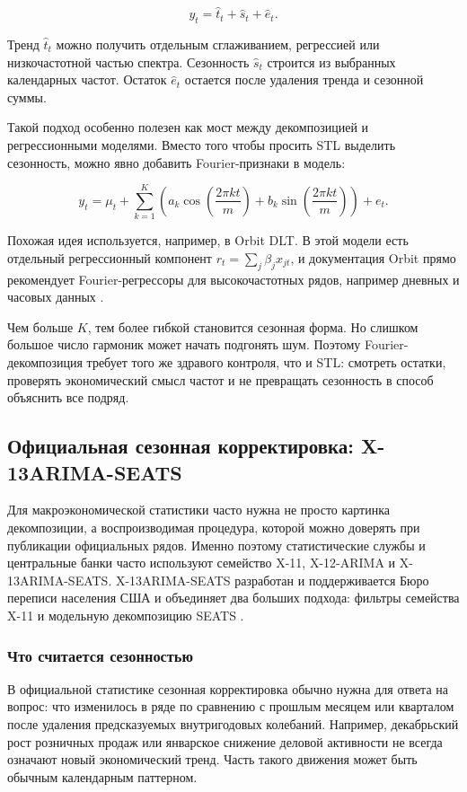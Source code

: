 \documentclass[12pt,fleqn]{article}
\begin{document}
\[
y_t
=
\hat t_t
+\hat s_t
+\hat e_t.
\]

Тренд \(\hat t_t\) можно получить отдельным сглаживанием, регрессией или низкочастотной частью спектра.
Сезонность \(\hat s_t\) строится из выбранных календарных частот.
Остаток \(\hat e_t\) остается после удаления тренда и сезонной суммы.

Такой подход особенно полезен как мост между декомпозицией и регрессионными моделями.
Вместо того чтобы просить STL выделить сезонность, можно явно добавить Fourier-признаки в модель:

\[
y_t
=
\mu_t
+\sum_{k=1}^{K}
\left(
a_k\cos\left(\frac{2\pi k t}{m}\right)
+b_k\sin\left(\frac{2\pi k t}{m}\right)
\right)
+e_t.
\]

Похожая идея используется, например, в Orbit DLT.
В этой модели есть отдельный регрессионный компонент \(r_t=\sum_j \beta_j x_{jt}\), и документация Orbit прямо рекомендует Fourier-регрессоры для высокочастотных рядов, например дневных и часовых данных \cite{orbitdlt}.

Чем больше \(K\), тем более гибкой становится сезонная форма.
Но слишком большое число гармоник может начать подгонять шум.
Поэтому Fourier-декомпозиция требует того же здравого контроля, что и STL: смотреть остатки, проверять экономический смысл частот и не превращать сезонность в способ объяснить все подряд.


\subsection{Официальная сезонная корректировка: X-13ARIMA-SEATS}


Для макроэкономической статистики часто нужна не просто картинка декомпозиции, а воспроизводимая процедура, которой можно доверять при публикации официальных рядов.
Именно поэтому статистические службы и центральные банки часто используют семейство X-11, X-12-ARIMA и X-13ARIMA-SEATS.
X-13ARIMA-SEATS разработан и поддерживается Бюро переписи населения США и объединяет два больших подхода: фильтры семейства X-11 и модельную декомпозицию SEATS \cite{x13census}.

\subsubsection{Что считается сезонностью}

В официальной статистике сезонная корректировка обычно нужна для ответа на вопрос: что изменилось в ряде по сравнению с прошлым месяцем или кварталом после удаления предсказуемых внутригодовых колебаний.
Например, декабрьский рост розничных продаж или январское снижение деловой активности не всегда означают новый экономический тренд.
Часть такого движения может быть обычным календарным паттерном.
\end{document}
